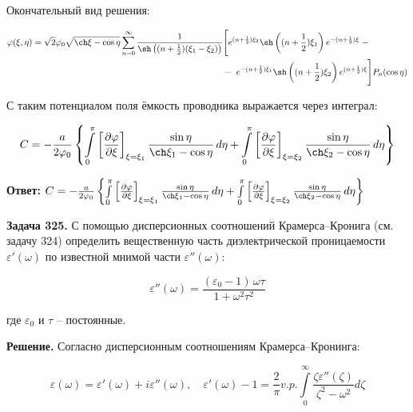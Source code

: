 \documentclass[a4paper,12pt]{article}
\begin{document}
	\quad Окончательный вид решения:
	
	\begin{equation}
		\begin{aligned}
			\varphi(\xi, \eta) = \sqrt{2}\varphi_0 \sqrt{\ch\xi - \cos\eta} \displaystyle\sum\limits_{n=0}^{\infty} \dfrac{1}{\sh\left((n+\frac{1}{2})(\xi_1 - \xi_2)\right)} &\Bigg[ e^{(n+\frac{1}{2})\xi_2} \sh\left((n+\frac{1}{2})\xi_1\right) e^{-(n+\frac{1}{2})\xi} \; - \\
			&- \; e^{-(n+\frac{1}{2})\xi_1} \sh\left((n+\frac{1}{2})\xi_2\right) e^{(n+\frac{1}{2})\xi} \Bigg] P_n(\cos\eta)
		\end{aligned}
	\end{equation}
	
	\quad С таким потенциалом поля ёмкость проводника выражается через интеграл: 
	
	\begin{equation}
		C = -\frac{a}{2\varphi_0} \left\{ \int\limits_{0}^{\pi} \left[ \frac{\partial\varphi}{\partial\xi} \right]_{\xi=\xi_1} \frac{\sin\eta}{\ch\xi_1 - \cos\eta} \, d\eta + \int\limits_{0}^{\pi} \left[ \frac{\partial\varphi}{\partial\xi} \right]_{\xi=\xi_2} \frac{\sin\eta}{\ch\xi_2 - \cos\eta} \, d\eta \right\}
	\end{equation}
	
	\quad \textbf{Ответ: $C = -\frac{a}{2\varphi_0} \left\{ \int\limits_{0}^{\pi} \left[ \frac{\partial\varphi}{\partial\xi} \right]_{\xi=\xi_1} \frac{\sin\eta}{\ch\xi_1 - \cos\eta} \, d\eta + \int\limits_{0}^{\pi} \left[ \frac{\partial\varphi}{\partial\xi} \right]_{\xi=\xi_2} \frac{\sin\eta}{\ch\xi_2 - \cos\eta} \, d\eta \right\}$}
	
	\quad \textbf{Задача 325.} С помощью дисперсионных соотношений Крамерса--Кронига (см. задачу 324) определить вещественную часть диэлектрической проницаемости $\varepsilon'(\omega)$ по известной мнимой части $\varepsilon''(\omega)$:
	
	\begin{equation}
		\varepsilon''(\omega) = \frac{(\varepsilon_0 - 1) \, \omega \tau}{1 + \omega^2 \tau^2}
	\end{equation}
	
	где $\varepsilon_0$ и $\tau$ -- постоянные.
	
	\quad \textbf{Решение.} Согласно дисперсионным соотношениям Крамерса--Кронинга:
	
	\begin{equation}
		\varepsilon(\omega) = \varepsilon'(\omega) + i\varepsilon''(\omega), \quad \varepsilon'(\omega) - 1 = \dfrac{2}{\pi} v.p.\displaystyle\int\limits_{0}^{\infty} \dfrac{\zeta\varepsilon''(\zeta)}{\zeta^2 - \omega^2}d\zeta
	\end{equation}
	
\end{document}
